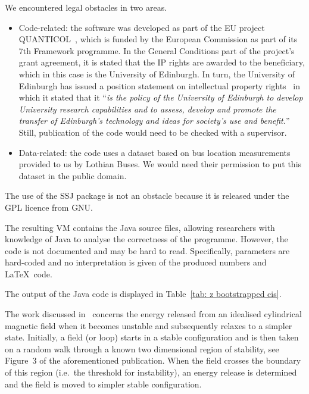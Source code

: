 We encountered legal obstacles in two areas.
\begin{itemize} 
\item Code-related: the software was developed as part of the EU project
    QUANTICOL~\cite{quanticol}, which is funded by the European Commission as part of its 7th
Framework programme. In the General Conditions part of the project's grant
agreement, it is stated that the IP rights are awarded to the beneficiary, which
in this case is the University of Edinburgh. In turn, the University of
Edinburgh has issued a position statement on intellectual property
rights~\cite{edinburgh:ipr}
in which it stated that it ``\emph{is the policy of the University of Edinburgh to develop University research capabilities and to assess, develop and promote the transfer of Edinburgh's technology and ideas for society's use and benefit.}'' Still, publication of the code would need to be checked with a supervisor.
\item Data-related: the code uses a dataset based on bus location measurements provided to us by Lothian Buses. We would need their permission to put this dataset in the public domain.
\end{itemize}
The use of the SSJ package is not an obstacle because it is released under the GPL licence from GNU.

The resulting VM contains the Java source files, allowing
researchers with knowledge of Java to analyse the correctness of the programme.
However, the code is not documented and may be hard to read. Specifically,
parameters are hard-coded and no interpretation is given of the produced
numbers and \LaTeX\ code.

The output of the Java code is displayed in Table~\ref{tab: z bootstrapped cis}.





The work discussed in~\cite{bareford2010nanoflare} concerns the energy released
from an idealised cylindrical magnetic field when it becomes unstable and
subsequently relaxes to a simpler state. Initially, a field (or loop) starts in
a stable configuration and is then taken on a random walk through a known two
dimensional region of stability, see \mbox{Figure 3} of the aforementioned
publication. When the field crosses the boundary of this region (i.e.\ the threshold for instability), an energy release is determined and the field is moved to simpler stable configuration. 

